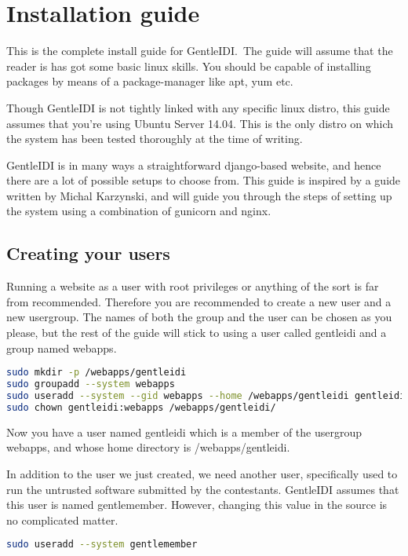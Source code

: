 \chapter{Installation guide}
This is the complete install guide for GentleIDI.\ The guide will assume
that the reader is has got some basic linux skills. You should be
capable of installing packages by means of a package-manager like apt,
yum etc.

Though GentleIDI is not tightly linked with any specific linux distro,
this guide assumes that you're using Ubuntu Server
14.04. This is the only distro on which the system has been tested
thoroughly at the time of writing.

GentleIDI is in many ways a straightforward django-based website, and
hence there are a lot of possible setups to choose from. This guide is
inspired by a guide written by Michal Karzynski, and will guide you
through the steps of setting up the system using a combination of
gunicorn and nginx.

\section{Creating your users}
Running a website as a user with root privileges or anything of the sort
is far from recommended. Therefore you are recommended to create a new
user and a new usergroup. The names of both the group and the user can
be chosen as you please, but the rest of the guide will stick to using
a user called gentleidi and a group named webapps.

\begin{lstlisting}[language=bash]
sudo mkdir -p /webapps/gentleidi
sudo groupadd --system webapps
sudo useradd --system --gid webapps --home /webapps/gentleidi gentleidi
sudo chown gentleidi:webapps /webapps/gentleidi/
\end{lstlisting}

Now you have a user named gentleidi which is a member of the usergroup
webapps, and whose home directory is /webapps/gentleidi.

In addition to the user we just created, we need another user,
specifically used to run the untrusted software submitted by the
contestants. GentleIDI assumes that this user is named gentlemember.
However, changing this value in the source is no complicated matter.

\begin{lstlisting}[language=bash]
sudo useradd --system gentlemember
\end{lstlisting}

